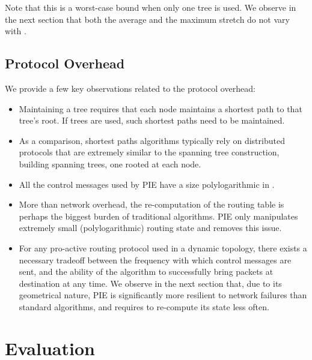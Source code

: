 \documentclass[conference]{IEEEtran}
\begin{document}
Note that this is a worst-case bound when only one tree is used.
We observe in the next section that both the average and the maximum stretch do not vary with .



\subsection{Protocol Overhead}
We provide a few key observations related to the protocol overhead:
\begin{itemize}
 \item Maintaining a tree requires that each node maintains a shortest path to that tree's root. If  trees are used,  such shortest paths need to be maintained.
 \item As a comparison, shortest paths algorithms typically rely on distributed protocols that are extremely similar to the spanning tree construction, building  spanning trees, one rooted at each node.
 \item All the control messages used by PIE have a size polylogarithmic in .
 \item More than network overhead, the re-computation of the routing table is perhaps the biggest burden of traditional algorithms. PIE only manipulates extremely small (polylogarithmic) routing state and removes this issue.
 \item For any pro-active routing protocol used in a dynamic topology, there exists a necessary tradeoff between the frequency with which control messages are sent, and the ability of the algorithm to successfully bring packets at destination at any time. We observe in the next section that, due to its geometrical nature, PIE is significantly more resilient to network failures than standard algorithms, and requires to re-compute its state less often.
\end{itemize}













\section{Evaluation}
\label{sec:perfeval}
\end{document}

